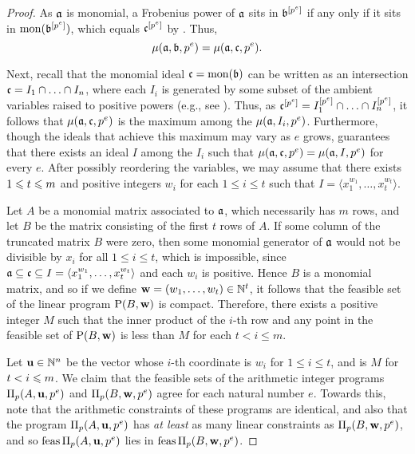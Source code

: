 \documentclass[11pt]{amsart}
\begin{document}
\begin{proof}
As $\mathfrak{a}$ is monomial, a Frobenius power of $\mathfrak{a}$ sits in $\mathfrak{b}^{[p^e]}$ if any only if it sits in $\operatorname{mon}(\mathfrak{b}^{[p^e]})$, which equals
$\mathfrak{c}^{[p^e]}$ by .  Thus, \[\mu(\mathfrak{a}, \mathfrak{b}, p^e) = \mu(\mathfrak{a}, \mathfrak{c}, p^e).\]

Next, recall that the monomial ideal $\mathfrak{c} = \operatorname{mon}(\mathfrak{b})$ can be written as an intersection $\mathfrak{c} = I_1 \cap \ldots \cap I_n$, where each $I_i$ is generated by some subset of the ambient variables raised to positive powers (e.g., see \cite[Lemma 5.18]{miller+sturmfels.combinatorial_CA}).  Thus, as $\mathfrak{c}^{[p^e]} = I_1^{[p^e]} \cap \ldots \cap I_n^{[p^e]}$, it follows that $\mu(\mathfrak{a}, \mathfrak{c}, p^e)$ is the maximum among the  $\mu(\mathfrak{a}, I_i, p^e)$.    Furthermore, though the ideals that achieve this maximum may vary as $e$ grows,  guarantees that there exists an ideal $I$ among the $I_i$ such that $\mu(\mathfrak{a}, \mathfrak{c}, p^e) = \mu(\mathfrak{a}, I, p^e)$ for every $e$.
After possibly reordering the variables,  we may assume that there exists $1 \leqslant t \leqslant m$ and positive integers $w_i$ for each $1 \leq i \leq t$ such that $I = \langle x_1^{w_1}, \ldots, x_t^{w_t} \rangle$.

Let $A$ be a monomial matrix associated to $\mathfrak{a}$, which necessarily has $m$ rows, and let $B$ be the matrix consisting of the first $t$ rows of $A$.  If some column of the truncated matrix $B$ were zero, then some monomial generator of $\mathfrak{a}$ would not be divisible by $x_i$  for all $1 \leq i \leq t$, which is impossible, since  $\mathfrak{a} \subseteq \mathfrak{c} \subseteq I = \langle x_1^{w_1}, \ldots, x_t^{w_t} \rangle$ and each $w_i$ is positive. Hence $B$ is a monomial matrix,  and so if we define $\mathbf{w} = (w_1, \ldots, w_t) \in \mathbb{N}^t$,   it follows that the feasible set of the linear program $\mathrm{P}(B, \mathbf{w})$ is compact.  Therefore, there exists a positive integer $M$ such that the inner product of the $i$-th row and any point in the feasible set of $\mathrm{P}(B, \mathbf{w})$ is less than $M$ for each $t < i \leq m$.   

Let $\mathbf{u} \in \mathbb{N}^n$ be the vector whose $i$-th coordinate is $w_i$ for $1 \leq i \leq t$, and is $M$ for $t < i \leqslant m$.  We claim that the feasible sets of the arithmetic integer programs $\Pi_p(A,\mathbf{u},p^e)$ and $\Pi_p(B,\mathbf{w},p^e)$ agree for each natural number $e$.  Towards this,  note that the arithmetic constraints of these programs are identical, and also that the program $\Pi_p(A, \mathbf{u}, p^e)$  has \emph{at least} as many linear constraints as $\Pi_p(B, \mathbf{w},p^e)$, and so 
$\operatorname{feas} \Pi_p(A, \mathbf{u}, p^e)$ lies in $\operatorname{feas} \Pi_p(B, \mathbf{w}, p^e)$.


\end{proof}
\end{document}
